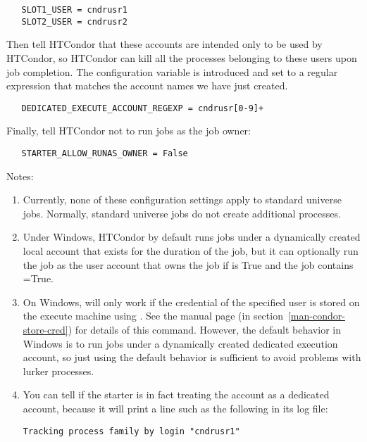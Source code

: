 \begin{verbatim}
   SLOT1_USER = cndrusr1
   SLOT2_USER = cndrusr2
\end{verbatim}

Then tell HTCondor that these accounts are intended only to be used by HTCondor,
so HTCondor can kill all the processes belonging to these users upon
job completion.
The configuration variable 
is introduced and set to a regular expression that matches the account
names we have just created.

\begin{verbatim}
   DEDICATED_EXECUTE_ACCOUNT_REGEXP = cndrusr[0-9]+
\end{verbatim}

Finally, tell HTCondor not to run jobs as the job owner:

\begin{verbatim}
   STARTER_ALLOW_RUNAS_OWNER = False
\end{verbatim}

Notes:
\begin{enumerate}

\item{ Currently, none of these configuration settings apply to
standard universe jobs.  Normally, standard universe jobs do not
create additional processes. }

\item{
Under Windows, HTCondor by default
runs jobs under a dynamically created local account that exists for
the duration of the job, but it can optionally run the job as the user
account that owns the job if  is
True and the job contains =True. }

\item{
On Windows,  will only work if the credential
of the specified user is stored on the execute machine
using .
See the 
manual page (in section~\ref{man-condor-store-cred})
for details of this command.  However, the default behavior in Windows
is to run jobs under a dynamically created dedicated execution account,
so just using the default behavior is sufficient to avoid problems
with lurker processes.
}
\item {
You can tell if the starter is in fact treating the account as a
dedicated account, because it will print a line such as the following
in its log file:

\begin{verbatim}
Tracking process family by login "cndrusr1"
\end{verbatim}
}
\end{enumerate}


